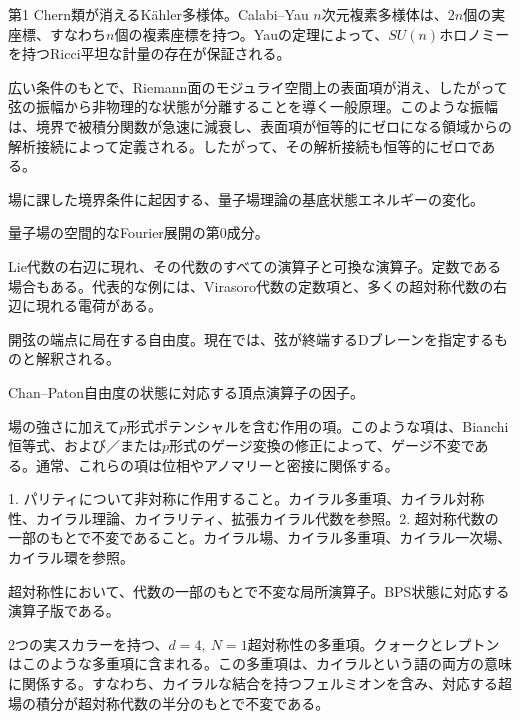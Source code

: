 {第1 Chern類が消えるKähler多様体。Calabi--Yau $n$次元複素多様体は、$2n$個の実座標、すなわち$n$個の複素座標を持つ。Yauの定理によって、$SU(n)$ホロノミーを持つRicci平坦な計量の存在が保証される。}

{広い条件のもとで、Riemann面のモジュライ空間上の表面項が消え、したがって弦の振幅から非物理的な状態が分離することを導く一般原理。このような振幅は、境界で被積分関数が急速に減衰し、表面項が恒等的にゼロになる領域からの解析接続によって定義される。したがって、その解析接続も恒等的にゼロである。}

{場に課した境界条件に起因する、量子場理論の基底状態エネルギーの変化。}

{量子場の空間的なFourier展開の第0成分。}

{Lie代数の右辺に現れ、その代数のすべての演算子と可換な演算子。定数である場合もある。代表的な例には、Virasoro代数の定数項と、多くの超対称代数の右辺に現れる電荷がある。}

{開弦の端点に局在する自由度。現在では、弦が終端するDブレーンを指定するものと解釈される。}

{Chan--Paton自由度の状態に対応する頂点演算子の因子。}

{場の強さに加えて$p$形式ポテンシャルを含む作用の項。このような項は、Bianchi恒等式、および／または$p$形式のゲージ変換の修正によって、ゲージ不変である。通常、これらの項は位相やアノマリーと密接に関係する。}

{1. パリティについて非対称に作用すること。カイラル多重項、カイラル対称性、カイラル理論、カイラリティ、拡張カイラル代数を参照。2. 超対称代数の一部のもとで不変であること。カイラル場、カイラル多重項、カイラル一次場、カイラル環を参照。}

{超対称性において、代数の一部のもとで不変な局所演算子。BPS状態に対応する演算子版である。}

{2つの実スカラーを持つ、$d=4,\ N=1$超対称性の多重項。クォークとレプトンはこのような多重項に含まれる。この多重項は、カイラルという語の両方の意味に関係する。すなわち、カイラルな結合を持つフェルミオンを含み、対応する超場の積分が超対称代数の半分のもとで不変である。}

